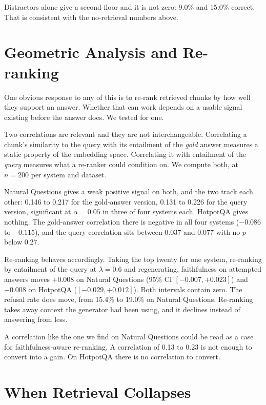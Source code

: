 \documentclass[11pt]{article}
\begin{document}
Distractors alone give a second floor and it is not zero: 9.0\% and 15.0\% correct. That is consistent with the no-retrieval numbers above.

\section{Geometric Analysis and Re-ranking}
\label{sec:esa}

One obvious response to any of this is to re-rank retrieved chunks by how well they support an answer. Whether that can work depends on a usable signal existing before the answer does. We tested for one.

Two correlations are relevant and they are not interchangeable. Correlating a chunk's similarity to the query with its entailment of the \emph{gold} answer measures a static property of the embedding space. Correlating it with entailment of the \emph{query} measures what a re-ranker could condition on. We compute both, at $n = 200$ per system and dataset.

Natural Questions gives a weak positive signal on both, and the two track each other: 0.146 to 0.217 for the gold-answer version, 0.131 to 0.226 for the query version, significant at $\alpha = 0.05$ in three of four systems each. HotpotQA gives nothing. The gold-answer correlation there is negative in all four systems ($-0.086$ to $-0.115$), and the query correlation sits between 0.037 and 0.077 with no $p$ below 0.27.

Re-ranking behaves accordingly. Taking the top twenty for one system, re-ranking by entailment of the query at $\lambda = 0.6$ and regenerating, faithfulness on attempted answers moves $+0.008$ on Natural Questions (95\% CI $[-0.007, +0.023]$) and $-0.008$ on HotpotQA ($[-0.029, +0.012]$). Both intervals contain zero. The refusal rate does move, from 15.4\% to 19.0\% on Natural Questions. Re-ranking takes away context the generator had been using, and it declines instead of answering from less.

A correlation like the one we find on Natural Questions could be read as a case for faithfulness-aware re-ranking. A correlation of 0.13 to 0.23 is not enough to convert into a gain. On HotpotQA there is no correlation to convert.

\section{When Retrieval Collapses}
\label{sec:qasper}
\end{document}
